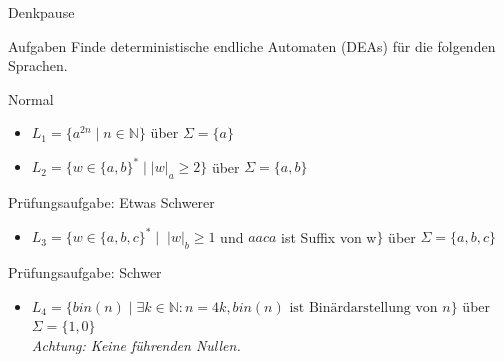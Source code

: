 {
\begin{frame}{Denkpause}
\footnotesize
    \begin{alertblock}{Aufgaben}
    Finde deterministische endliche Automaten (DEAs) für die folgenden Sprachen.
    \end{alertblock}
    \begin{block}{Normal}
    \begin{itemize}
        \item $L_1 = \{a^{2n} \mid n \in \mathbb{N}\}$ über $\Sigma=\{a\}$
        \item $L_2 = \{w\in \{a,b\}^* \mid |w|_a \geq 2\}$ über $\Sigma=\{a,b\}$
    \end{itemize}
    \end{block}
    \begin{block}{Prüfungsaufgabe: Etwas Schwerer}
    \begin{itemize}
        \item $L_3 = \{w \in \{a, b, c\}^* \mid \; |w|_b \geq 1$ und $aaca$ ist Suffix von w$\}$ über $\Sigma=\{a,b,c\}$
    \end{itemize}
    \end{block}
    \begin{block}{Prüfungsaufgabe: Schwer}
    \begin{itemize}
        \item $L_4 = \{bin(n)\mid \exists k \in \mathbb{N}: n=4k, bin(n)\text{ ist Binärdarstellung von }n\}$ über $\Sigma=\{1,0\}$\\
        \emph{Achtung: Keine führenden Nullen.}
    \end{itemize}
    \end{block}
\end{frame}
}

